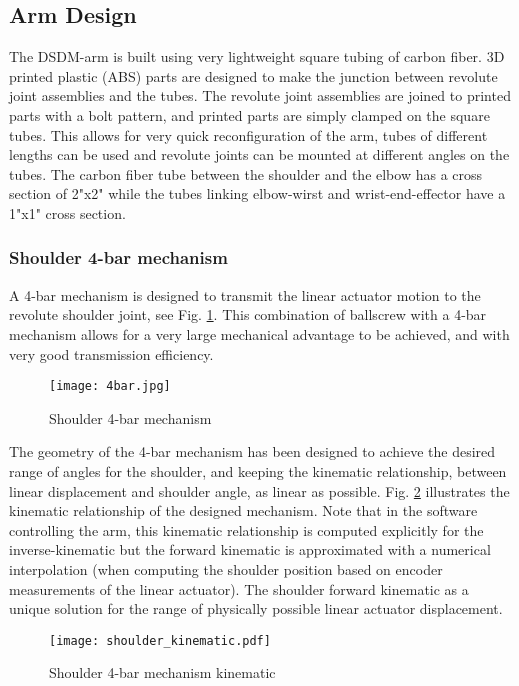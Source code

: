 \subsection{Arm Design}
\label{sec:DSDMArm}

The DSDM-arm is built using very lightweight square tubing of carbon fiber. 3D printed plastic (ABS) parts are designed to make the junction between revolute joint assemblies and the tubes. The revolute joint assemblies are joined to printed parts with a bolt pattern, and printed parts are simply clamped on the square tubes. This allows for very quick reconfiguration of the arm, tubes of different lengths can be used and revolute joints can be mounted at different angles on the tubes. The carbon fiber tube between the shoulder and the elbow has a cross section of 2"x2" while the tubes linking elbow-wirst and wrist-end-effector have a 1"x1" cross section. 

\subsubsection{Shoulder 4-bar mechanism}

A 4-bar mechanism is designed to transmit the linear actuator motion to the revolute shoulder joint, see Fig. \ref{fig:4bar}. This combination of ballscrew with a 4-bar mechanism allows for a very large mechanical advantage to be achieved, and with very good transmission efficiency.  

\begin{figure}[htbp]
	\centering
		\texttt{[image: 4bar.jpg]}
	\caption{Shoulder 4-bar mechanism}
	\label{fig:4bar}
\end{figure}

The geometry of the 4-bar mechanism has been designed to achieve the desired range of angles for the shoulder, and keeping the kinematic relationship, between linear displacement and shoulder angle, as linear as possible. Fig. \ref{fig:shoulder_kinematic} illustrates the kinematic relationship of the designed mechanism. Note that in the software controlling the arm, this kinematic relationship is computed explicitly for the inverse-kinematic but the forward kinematic is approximated with a numerical interpolation (when computing the shoulder position based on encoder measurements of the linear actuator). The shoulder forward kinematic as a unique solution for the range of physically possible linear actuator displacement.

\begin{figure}[htbp]
	\centering
		\texttt{[image: shoulder\_kinematic.pdf]}
	\caption{Shoulder 4-bar mechanism kinematic}
	\label{fig:shoulder_kinematic}
\end{figure}

